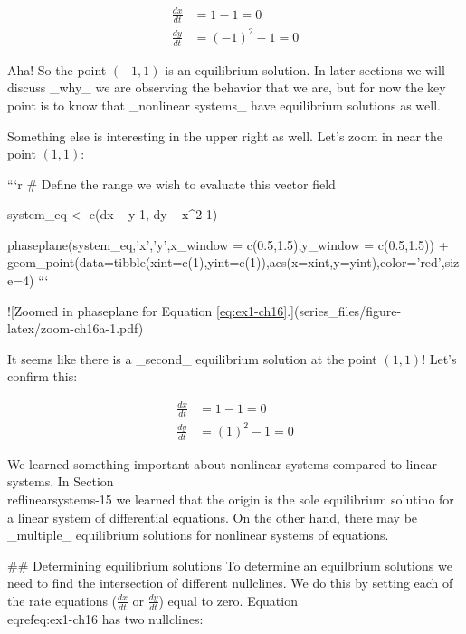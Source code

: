 \documentclass[
]{book}
\theoremstyle{definition}
\theoremstyle{definition}
\theoremstyle{definition}
\theoremstyle{remark}
\begin{document}
\begin{equation}
\begin{split} 
\frac{dx}{dt} &= 1-1 = 0 \\ 
\frac{dy}{dt} &= (-1)^{2}-1  = 0
\end{split}
\end{equation}

Aha!  So the point $(-1,1)$ is an equilibrium solution.  In later sections we will discuss _why_ we are observing the behavior that we are, but for now the key point is to know that _nonlinear systems_ have equilibrium solutions as well.

Something else is interesting in the upper right as well.  Let's zoom in near the point $(1,1)$:


```r
# Define the range we wish to evaluate this vector field


system_eq <- c(dx ~ y-1,
               dy ~ x^2-1)

phaseplane(system_eq,'x','y',x_window = c(0.5,1.5),y_window = c(0.5,1.5)) +
  geom_point(data=tibble(xint=c(1),yint=c(1)),aes(x=xint,y=yint),color='red',size=4)
```

![\label{fig:zoom-ch16a}Zoomed in phaseplane for Equation \ref{eq:ex1-ch16}.](series_files/figure-latex/zoom-ch16a-1.pdf) 

It seems like there is a _second_ equilibrium solution at the point $(1,1)$!  Let's confirm this:

\begin{equation}
\begin{split} 
\frac{dx}{dt} &= 1-1 = 0 \\ 
\frac{dy}{dt} &= (1)^{2}-1  = 0
\end{split}
\end{equation}

We learned something important about nonlinear systems compared to linear systems.  In Section \\ref{linearsystems-15} we learned that the origin is the sole equilibrium solutino for a linear system of differential equations.  On the other hand, there may be _multiple_ equilibrium solutions for nonlinear systems of equations.

## Determining equilibrium solutions
To determine an equilbrium solutions we need to find the intersection of different nullclines. We do this by setting each of the rate equations ($\displaystyle \frac{dx}{dt}$ or $\displaystyle \frac{dy}{dt}$) equal to zero. Equation \\eqref{eq:ex1-ch16} has two nullclines:
\end{document}
